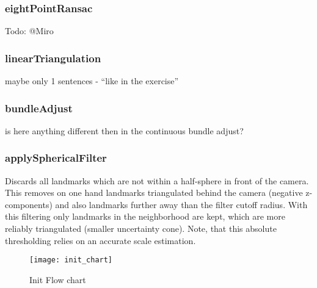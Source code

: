 \subsubsection{eightPointRansac}
Todo: @Miro

\subsubsection{linearTriangulation}
maybe only 1 sentences - ``like in the exercise''

\subsubsection{bundleAdjust}
is here anything different then in the continuous bundle adjust?

\subsubsection{applySphericalFilter}
\label{sub_sec_sphFilter}
Discards all landmarks which are not within a half-sphere in front of the camera. This removes on one hand landmarks triangulated behind the camera (negative z-components) and also landmarks further away than the filter cutoff radius. With this filtering only landmarks in the neighborhood are kept, which are more reliably triangulated (smaller uncertainty cone). Note, that this absolute thresholding relies on an accurate scale estimation.

\begin{figure}[ht]
	\centering
	\texttt{[image: init\_chart]}
	\caption{Init Flow chart}
	\label{img_flow_init}
\end{figure}
